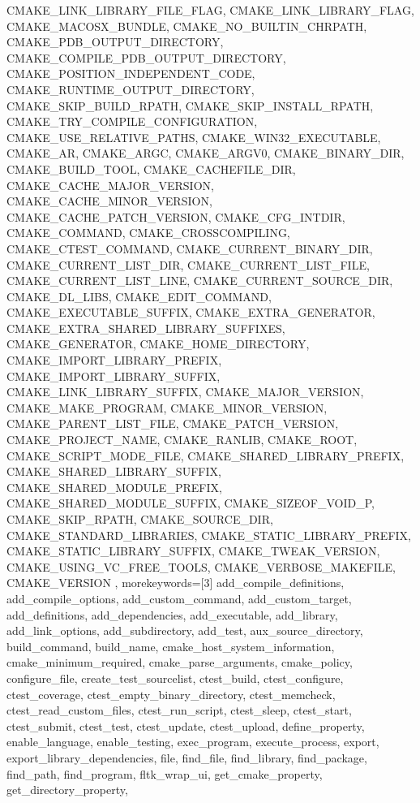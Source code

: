 {{      CMAKE_LINK_LIBRARY_FILE_FLAG, CMAKE_LINK_LIBRARY_FLAG,
      CMAKE_MACOSX_BUNDLE, CMAKE_NO_BUILTIN_CHRPATH,
      CMAKE_PDB_OUTPUT_DIRECTORY, CMAKE_COMPILE_PDB_OUTPUT_DIRECTORY,
      CMAKE_POSITION_INDEPENDENT_CODE, CMAKE_RUNTIME_OUTPUT_DIRECTORY,
      CMAKE_SKIP_BUILD_RPATH, CMAKE_SKIP_INSTALL_RPATH,
      CMAKE_TRY_COMPILE_CONFIGURATION, CMAKE_USE_RELATIVE_PATHS,
      CMAKE_WIN32_EXECUTABLE, CMAKE_AR, CMAKE_ARGC, CMAKE_ARGV0,
      CMAKE_BINARY_DIR, CMAKE_BUILD_TOOL, CMAKE_CACHEFILE_DIR,
      CMAKE_CACHE_MAJOR_VERSION, CMAKE_CACHE_MINOR_VERSION,
      CMAKE_CACHE_PATCH_VERSION, CMAKE_CFG_INTDIR, CMAKE_COMMAND,
      CMAKE_CROSSCOMPILING, CMAKE_CTEST_COMMAND, CMAKE_CURRENT_BINARY_DIR,
      CMAKE_CURRENT_LIST_DIR, CMAKE_CURRENT_LIST_FILE,
      CMAKE_CURRENT_LIST_LINE, CMAKE_CURRENT_SOURCE_DIR, CMAKE_DL_LIBS,
      CMAKE_EDIT_COMMAND, CMAKE_EXECUTABLE_SUFFIX, CMAKE_EXTRA_GENERATOR,
      CMAKE_EXTRA_SHARED_LIBRARY_SUFFIXES, CMAKE_GENERATOR,
      CMAKE_HOME_DIRECTORY, CMAKE_IMPORT_LIBRARY_PREFIX,
      CMAKE_IMPORT_LIBRARY_SUFFIX, CMAKE_LINK_LIBRARY_SUFFIX,
      CMAKE_MAJOR_VERSION, CMAKE_MAKE_PROGRAM, CMAKE_MINOR_VERSION,
      CMAKE_PARENT_LIST_FILE, CMAKE_PATCH_VERSION, CMAKE_PROJECT_NAME,
      CMAKE_RANLIB, CMAKE_ROOT, CMAKE_SCRIPT_MODE_FILE,
      CMAKE_SHARED_LIBRARY_PREFIX, CMAKE_SHARED_LIBRARY_SUFFIX,
      CMAKE_SHARED_MODULE_PREFIX, CMAKE_SHARED_MODULE_SUFFIX,
      CMAKE_SIZEOF_VOID_P, CMAKE_SKIP_RPATH, CMAKE_SOURCE_DIR,
      CMAKE_STANDARD_LIBRARIES, CMAKE_STATIC_LIBRARY_PREFIX,
      CMAKE_STATIC_LIBRARY_SUFFIX, CMAKE_TWEAK_VERSION,
      CMAKE_USING_VC_FREE_TOOLS, CMAKE_VERBOSE_MAKEFILE, CMAKE_VERSION },
    morekeywords=[3]{ add_compile_definitions, add_compile_options,
      add_custom_command, add_custom_target, add_definitions,
      add_dependencies, add_executable, add_library, add_link_options,
      add_subdirectory, add_test, aux_source_directory, build_command,
      build_name, cmake_host_system_information, cmake_minimum_required,
      cmake_parse_arguments, cmake_policy, configure_file,
      create_test_sourcelist, ctest_build, ctest_configure, ctest_coverage,
      ctest_empty_binary_directory, ctest_memcheck,
      ctest_read_custom_files, ctest_run_script, ctest_sleep, ctest_start,
      ctest_submit, ctest_test, ctest_update, ctest_upload,
      define_property, enable_language, enable_testing, exec_program,
      execute_process, export, export_library_dependencies, file,
      find_file, find_library, find_package, find_path, find_program,
      fltk_wrap_ui, get_cmake_property, get_directory_property,
}}
